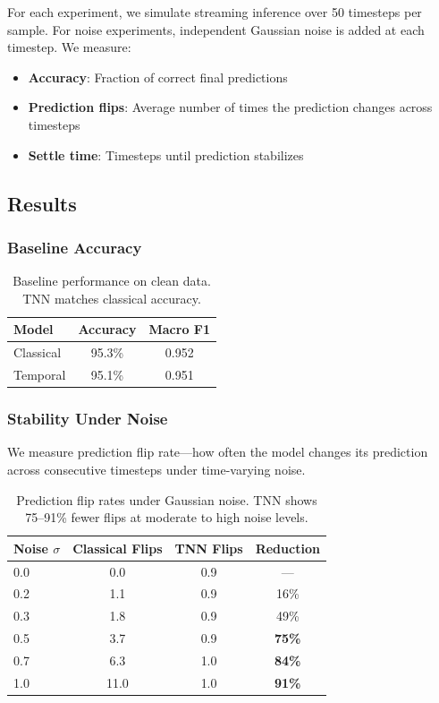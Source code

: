 \documentclass[11pt]{article}
\begin{document}
For each experiment, we simulate streaming inference over 50 timesteps per sample. For noise experiments, independent Gaussian noise is added at each timestep. We measure:

\begin{itemize}
    \item \textbf{Accuracy}: Fraction of correct final predictions
    \item \textbf{Prediction flips}: Average number of times the prediction changes across timesteps
    \item \textbf{Settle time}: Timesteps until prediction stabilizes
\end{itemize}

\subsection{Results}

\subsubsection{Baseline Accuracy}

\begin{table}[h]
\centering
\begin{tabular}{lcc}
\toprule
Model & Accuracy & Macro F1 \\
\midrule
Classical & 95.3\% & 0.952 \\
Temporal & 95.1\% & 0.951 \\
\bottomrule
\end{tabular}
\caption{Baseline performance on clean data. TNN matches classical accuracy.}
\label{tab:baseline}
\end{table}

\subsubsection{Stability Under Noise}

We measure prediction flip rate---how often the model changes its prediction across consecutive timesteps under time-varying noise.

\begin{table}[h]
\centering
\begin{tabular}{lccc}
\toprule
Noise $\sigma$ & Classical Flips & TNN Flips & Reduction \\
\midrule
0.0 & 0.0 & 0.9 & --- \\
0.2 & 1.1 & 0.9 & 16\% \\
0.3 & 1.8 & 0.9 & 49\% \\
0.5 & 3.7 & 0.9 & \textbf{75\%} \\
0.7 & 6.3 & 1.0 & \textbf{84\%} \\
1.0 & 11.0 & 1.0 & \textbf{91\%} \\
\bottomrule
\end{tabular}
\caption{Prediction flip rates under Gaussian noise. TNN shows 75--91\% fewer flips at moderate to high noise levels.}
\label{tab:flips}
\end{table}
\end{document}

